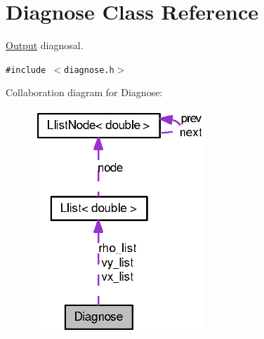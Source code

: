 \hypertarget{classDiagnose}{
\section{Diagnose Class Reference}
\label{classDiagnose}
}
\hyperlink{classOutput}{Output} diagnosal.  


{\tt \#include $<$diagnose.h$>$}

Collaboration diagram for Diagnose:\nopagebreak
\begin{figure}[H]
\begin{center}
\leavevmode
\includegraphics[width=183pt]{classDiagnose__coll__graph}
\end{center}
\end{figure}

